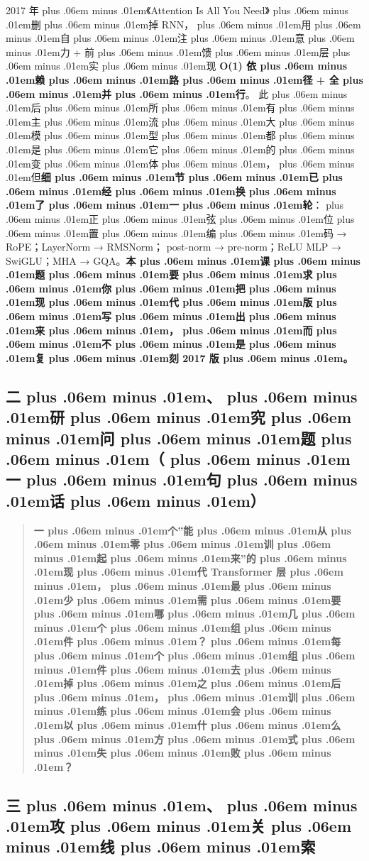 \documentclass[
]{article}
\def\zh#1{{\zhfont #1}}
\def\sym#1{{\symfont #1}}
\def\zhglue{\hskip0pt plus .06em minus .01em}
\begin{document}
2017 \zh{年\zhglue 《}Attention Is All You Need\zh{》\zhglue 删\zhglue 掉} RNN\zh{，\zhglue 用\zhglue 自\zhglue 注\zhglue 意\zhglue 力} + \zh{前\zhglue 馈\zhglue 层\zhglue 实\zhglue 现} \textbf{O(1) \zh{依\zhglue 赖\zhglue 路\zhglue 径} + \zh{全\zhglue 并\zhglue 行}}\zh{。} \zh{此\zhglue 后\zhglue 所\zhglue 有\zhglue 主\zhglue 流\zhglue 大\zhglue 模\zhglue 型\zhglue 都\zhglue 是\zhglue 它\zhglue 的\zhglue 变\zhglue 体\zhglue ，\zhglue 但}\textbf{\zh{细\zhglue 节\zhglue 已\zhglue 经\zhglue 换\zhglue 了\zhglue 一\zhglue 轮}}\zh{：\zhglue 正\zhglue 弦\zhglue 位\zhglue 置\zhglue 编\zhglue 码} \sym{→} RoPE\zh{；}LayerNorm \sym{→} RMSNorm\zh{；} post-norm \sym{→} pre-norm\zh{；}ReLU MLP \sym{→} SwiGLU\zh{；}MHA \sym{→} GQA\zh{。}\textbf{\zh{本\zhglue 课\zhglue 题\zhglue 要\zhglue 求\zhglue 你\zhglue 把\zhglue 现\zhglue 代\zhglue 版\zhglue 写\zhglue 出\zhglue 来\zhglue ，\zhglue 而\zhglue 不\zhglue 是\zhglue 复\zhglue 刻} 2017 \zh{版\zhglue 。}}

\subsection{\zh{二\zhglue 、\zhglue 研\zhglue 究\zhglue 问\zhglue 题\zhglue （\zhglue 一\zhglue 句\zhglue 话\zhglue ）}}\label{ux4e8cux7814ux7a76ux95eeux9898ux4e00ux53e5ux8bdd}

\begin{quote}
\textbf{\zh{一\zhglue 个}''\zh{能\zhglue 从\zhglue 零\zhglue 训\zhglue 起\zhglue 来}''\zh{的\zhglue 现\zhglue 代} Transformer \zh{层\zhglue ，\zhglue 最\zhglue 少\zhglue 需\zhglue 要\zhglue 哪\zhglue 几\zhglue 个\zhglue 组\zhglue 件\zhglue ？\zhglue 每\zhglue 个\zhglue 组\zhglue 件\zhglue 去\zhglue 掉\zhglue 之\zhglue 后\zhglue ，\zhglue 训\zhglue 练\zhglue 会\zhglue 以\zhglue 什\zhglue 么\zhglue 方\zhglue 式\zhglue 失\zhglue 败\zhglue ？}}
\end{quote}

\subsection{\zh{三\zhglue 、\zhglue 攻\zhglue 关\zhglue 线\zhglue 索}}\label{ux4e09ux653bux5173ux7ebfux7d22}
\end{document}
